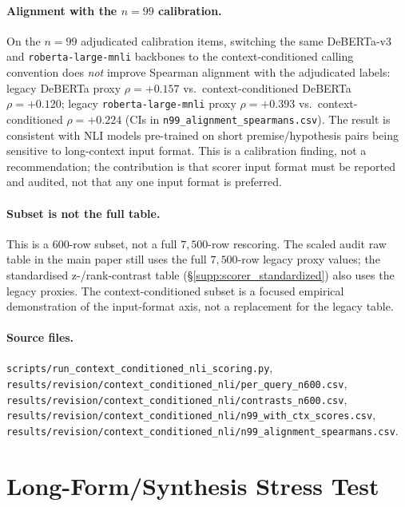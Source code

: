 \documentclass[11pt]{article}
\begin{document}
\paragraph{Alignment with the $n=99$ calibration.} On the
$n=99$ adjudicated calibration items, switching the same DeBERTa-v$3$
and \texttt{roberta-large-mnli} backbones to the context-conditioned
calling convention does \emph{not} improve Spearman alignment with the
adjudicated labels: legacy DeBERTa proxy $\rho=+0.157$ vs.\
context-conditioned DeBERTa $\rho=+0.120$; legacy
\texttt{roberta-large-mnli} proxy $\rho=+0.393$ vs.\
context-conditioned $\rho=+0.224$ (CIs in
\texttt{n99\_alignment\_spearmans.csv}). The result is consistent with
NLI models pre-trained on short premise/hypothesis pairs being
sensitive to long-context input format. This is a calibration finding,
not a recommendation; the contribution is that scorer input format
must be reported and audited, not that any one input format is
preferred.

\paragraph{Subset is not the full table.} This is a $600$-row
subset, not a full $7{,}500$-row rescoring. The scaled audit raw
table in the main paper still uses the full $7{,}500$-row legacy
proxy values; the standardised z-/rank-contrast table
(\S\ref{supp:scorer_standardized}) also uses the legacy proxies. The
context-conditioned subset is a focused empirical demonstration of
the input-format axis, not a replacement for the legacy table.

\paragraph{Source files.}
\begin{sloppypar}
\texttt{scripts/run\_context\_conditioned\_nli\_scoring.py},
\texttt{results/revision/context\_conditioned\_nli/per\_query\_n600.csv},
\texttt{results/revision/context\_conditioned\_nli/contrasts\_n600.csv},
\texttt{results/revision/context\_conditioned\_nli/n99\_with\_ctx\_scores.csv},
\texttt{results/revision/context\_conditioned\_nli/n99\_alignment\_spearmans.csv}.
\end{sloppypar}

\section{Long-Form/Synthesis Stress Test}
\label{supp:longform}
\end{document}
